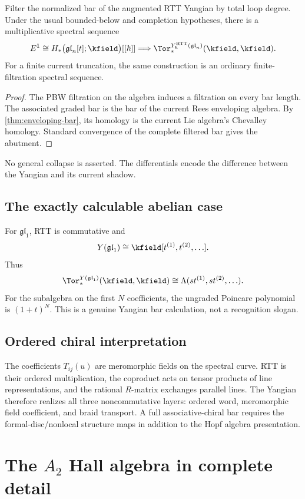 \begin{theorem}\label{thm:yangian-bar-ss}
Filter the normalized bar of the augmented RTT Yangian by total loop degree.  Under the usual bounded-below and completion hypotheses, there is a multiplicative spectral sequence
\[
 E^1\cong H_*\bigl(\mathfrak{gl}_n[t];\kfield\bigr)[[\hbar]]
 \Longrightarrow
 \Tor_*^{Y_\hbar^{\mathrm{RTT}}(\mathfrak{gl}_n)}(\kfield,\kfield).
\]
For a finite current truncation, the same construction is an ordinary finite-filtration spectral sequence.
\end{theorem}
\begin{proof}
The PBW filtration on the algebra induces a filtration on every bar length.  The associated graded bar is the bar of the current Rees enveloping algebra.  By \cref{thm:enveloping-bar}, its homology is the current Lie algebra's Chevalley homology.  Standard convergence of the complete filtered bar gives the abutment.
\end{proof}

No general collapse is asserted.  The differentials encode the difference between the Yangian and its current shadow.

\section{The exactly calculable abelian case}
For \(\mathfrak{gl}_1\), RTT is commutative and
\[
 Y(\mathfrak{gl}_1)\cong\kfield[t^{(1)},t^{(2)},\ldots].
\]
Thus
\[
 \Tor_*^{Y(\mathfrak{gl}_1)}(\kfield,\kfield)
 \cong\Lambda(s t^{(1)},s t^{(2)},\ldots).
\]
For the subalgebra on the first \(N\) coefficients, the ungraded Poincare polynomial is \((1+t)^N\).  This is a genuine Yangian bar calculation, not a recognition slogan.

\section{Ordered chiral interpretation}
The coefficients \(T_{ij}(u)\) are meromorphic fields on the spectral curve.  RTT is their ordered multiplication, the coproduct acts on tensor products of line representations, and the rational \(R\)-matrix exchanges parallel lines.  The Yangian therefore realizes all three noncommutative layers: ordered word, meromorphic field coefficient, and braid transport.  A full associative-chiral bar requires the formal-disc/nonlocal structure maps in addition to the Hopf algebra presentation.

\chapter{The \(A_2\) Hall algebra in complete detail}\label{chap:hall}

